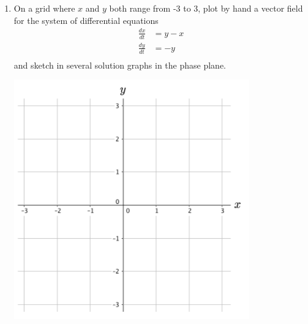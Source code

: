 \begin{enumerate}[resume]
\item	On a grid where $x$ and $y$ both range from -3 to 3, plot by hand a vector field for the system of differential equations \label{09problem9}
\begin{align*}
	\frac{dx}{dt} &= y-x\\
	\frac{dy}{dt} &= -y\\
\end{align*}
   and sketch in several solution graphs in the phase plane. 
\begin{center}
	\includegraphics[width=4in]{09/09VectorField1.png}\\
\end{center}
\vfill
 

\end{enumerate}
